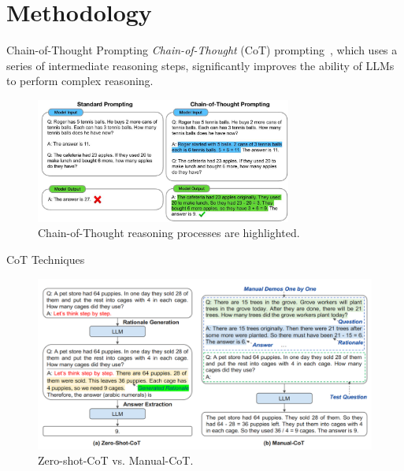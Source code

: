 \section{Methodology}

\begin{frame}{Chain-of-Thought Prompting}
    \textit{Chain-of-Thought} (CoT) prompting~\cite{wei2023chainofthought}, which uses a series of intermediate reasoning steps, significantly improves the ability of LLMs to perform complex reasoning.\\
    \begin{figure}[!htb]
        \centering
        \includegraphics[width=0.75\textwidth]{img/cot_prompting}
        \captionsetup{font=small,labelformat=empty}
        \caption{Chain-of-Thought reasoning processes are highlighted.}
    \end{figure}
\end{frame}

\begin{frame}{CoT Techniques}
    \begin{figure}[!htb]
        \centering
        \includegraphics[width=\textwidth]{img/cot_types}
        \captionsetup{font=small,labelformat=empty}
        \caption{Zero-shot-CoT vs. Manual-CoT.}
    \end{figure}
\end{frame}

